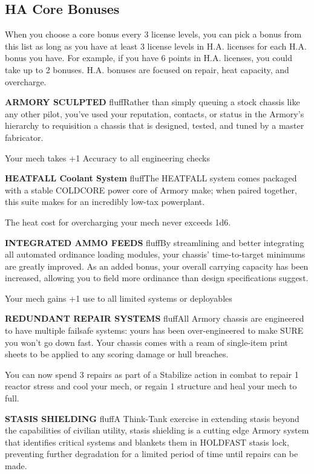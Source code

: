 \subsection{HA Core Bonuses}

When you choose a core bonus every 3 license levels, you can pick a bonus from this list as long as you have at least 3 license levels in H.A. licenses for each H.A. bonus you have. For example, if you have 6 points in H.A. licenses, you could take up to 2 bonuses. H.A. bonuses are focused on repair, heat capacity, and overcharge.


\textbf{ARMORY SCULPTED}\newline
fluff{Rather than simply queuing a stock chassis like any other pilot, you've used your reputation, contacts, or status in the Armory's hierarchy to requisition a chassis that is designed, tested, and tuned by a master fabricator.}

Your mech takes +1 Accuracy to all engineering checks

\textbf{HEATFALL Coolant System}\newline
fluff{The HEATFALL system comes packaged with a stable COLDCORE power core of Armory make; when paired together, this suite makes for an incredibly low-tax powerplant.}

The heat cost for overcharging your mech never exceeds 1d6.


\textbf{INTEGRATED AMMO FEEDS}\newline
fluff{By streamlining and better integrating all automated ordinance loading modules, your chassis' time-to-target minimums are greatly improved. As an added bonus, your overall carrying capacity has been increased, allowing you to field more ordinance than design specifications suggest.}

Your mech gains +1 use to all limited systems or deployables


\textbf{REDUNDANT REPAIR SYSTEMS}\newline
fluff{All Armory chassis are engineered to have multiple failsafe systems: yours has been over-engineered to make SURE you won't go down fast. Your chassis comes with a ream of single-item print sheets to be applied to any scoring damage or hull breaches.}

You can now spend 3 repairs as part of a Stabilize action in combat to repair 1 reactor stress and cool your mech, or regain 1 structure and heal your mech to full.


\textbf{STASIS SHIELDING}\newline
fluff{A Think-Tank exercise in extending stasis beyond the capabilities of civilian utility, stasis shielding is a cutting edge Armory system that identifies critical systems and blankets them in HOLDFAST stasis lock, preventing further degradation for a limited period of time until repairs can be made.}

